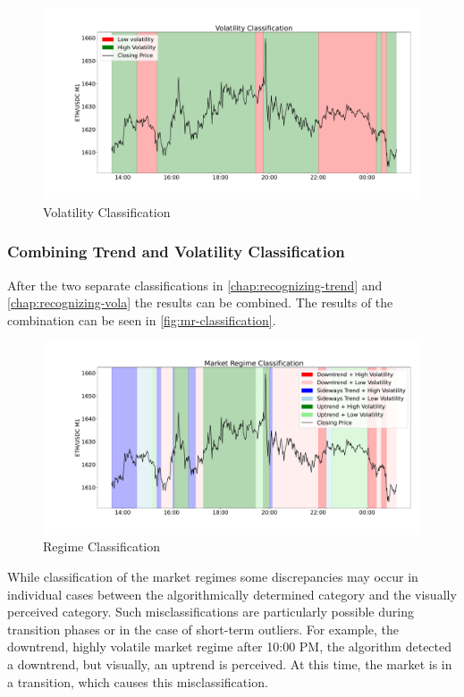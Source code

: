 \begin{figure}[H]
    \centering
    \includegraphics[width=\textwidth]{images/market-regime/market_regime_vola}
    \caption{Volatility Classification}
    \label{fig:mr-vola-classification}
\end{figure}

\subsubsection{Combining Trend and Volatility Classification}

After the two separate classifications in \autoref{chap:recognizing-trend} and \autoref{chap:recognizing-vola} the results can be combined.
The results of the combination can be seen in \autoref{fig:mr-classification}.

\begin{figure}[H]
    \centering
    \includegraphics[width=\textwidth]{images/market-regime/market_regime}
    \caption{Regime Classification}
    \label{fig:mr-classification}
\end{figure}

\noindent
While classification of the market regimes some discrepancies may occur in individual cases between the algorithmically determined category and the visually perceived category.
Such misclassifications are particularly possible during transition phases or in the case of short-term outliers.
For example, the downtrend, highly volatile market regime after 10:00 PM, the algorithm detected a downtrend, but visually, an uptrend is perceived.
At this time, the market is in a transition, which causes this misclassification.

